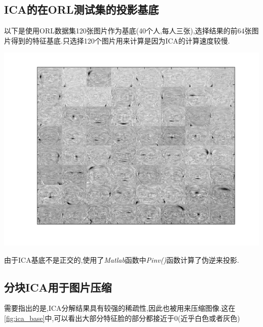 \subsection{ICA的在ORL测试集的投影基底}
以下是使用ORL数据集120张图片作为基底(40个人,每人三张),选择结果的前64张图片得到的特征基底.只选择120个图片用来计算是因为ICA的计算速度较慢.
\begin{center}
\begin{minipage}[t]{\linewidth}
\center
{
\includegraphics[width=\textwidth]{Img/ica_base.png} 
\label{fig:ica_base}
}
\end{minipage}
\medskip
\end{center}
由于ICA基底不是正交的,使用了\textit{Matlab}函数中\textit{Pinv()}函数计算了伪逆来投影.

\subsection{分块ICA用于图片压缩}
需要指出的是,ICA分解结果具有较强的稀疏性,因此也被用来压缩图像.这在\ref{fig:ica_base}中,可以看出大部分特征脸的部分都接近于0(近乎白色或者灰色)

